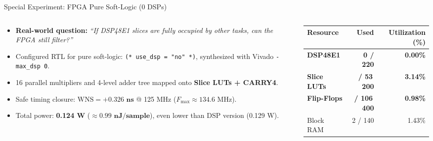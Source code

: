 \begin{frame}{Special Experiment: FPGA Pure Soft-Logic (0 DSPs)}
\begin{columns}[T]
\begin{column}{0.51\linewidth}\small
\begin{itemize}\setlength{\itemsep}{3pt}
\item \textbf{Real-world question:} \emph{``If DSP48E1 slices are fully occupied by other tasks, can the FPGA still filter?''}
\item Configured RTL for pure soft-logic: \texttt{(* use\_dsp = "no" *)}, synthesized with Vivado \texttt{-max\_dsp 0}.
\item 16 parallel multipliers and 4-level adder tree mapped onto \textbf{Slice LUTs + CARRY4}.
\item Safe timing closure: $\text{WNS} = \mathbf{+0.326\text{ ns}}$ @ 125 MHz ($F_{\max} \approx 134.6\text{ MHz}$).
\item Total power: \textbf{0.124 W} ($\approx \mathbf{0.99\text{ nJ/sample}}$), even lower than DSP version (0.129 W).
\end{itemize}
\end{column}
\begin{column}{0.45\linewidth}\footnotesize
\begin{tabularx}{\linewidth}{@{}l r r@{}}
\toprule
Resource & Used & Utilization (\%) \\
\midrule
\textbf{DSP48E1} & \textbf{0 / 220} & \textbf{0.00\%} \\
\textbf{Slice LUTs} & \textbf{\expFpgaLut{} / 53\,200} & \textbf{3.14\%} \\
\textbf{Flip-Flops} & \textbf{\expFpgaFf{} / 106\,400} & \textbf{0.98\%} \\
Block RAM & 2 / 140 & 1.43\% \\
\bottomrule
\end{tabularx}
\par\vspace{4pt}
\end{column}
\end{columns}
\end{frame}

